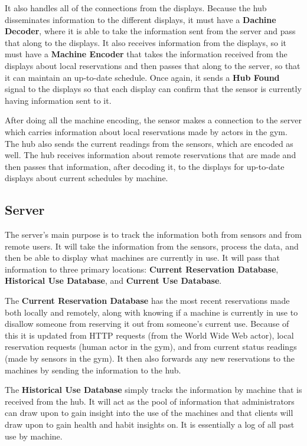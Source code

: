 \documentclass[PPFS.tex]{template/subfiles}
\begin{document}
It also handles all of the connections from the displays. Because the hub disseminates information to the different displays, it must have a \textbf{Dachine Decoder}, where it is able to take the information sent from the server and pass that along to the displays. It also receives information from the displays, so it must have a \textbf{Machine Encoder} that takes the information received from the displays about local reservations and then passes that along to the server, so that it can maintain an up-to-date schedule. Once again, it sends a \textbf{Hub Found} signal to the displays so that each display can confirm that the sensor is currently having information sent to it.

After doing all the machine encoding, the sensor makes a connection to the server which carries information about local reservations made by actors in the gym. The hub also sends the current readings from the sensors, which are encoded as well. The hub receives information about remote reservations that are made and then passes that information, after decoding it, to the displays for up-to-date displays about current schedules by machine.

\subsection{Server}

The server's main purpose is to track the information both from sensors and from remote users. It will take the information from the sensors, process the data, and then be able to display what machines are currently in use. It will pass that information to three primary locations: \textbf{Current Reservation Database}, \textbf{Historical Use Database}, and \textbf{Current Use Database}.

The \textbf{Current Reservation Database} has the most recent reservations made both locally and remotely, along with knowing if a machine is currently in use to disallow someone from reserving it out from someone's current use. Because of this it is updated from HTTP requests (from the World Wide Web actor), local reservation requests (human actor in the gym), and from current status readings (made by sensors in the gym). It then also forwards any new reservations to the machines by sending the information to the hub.

The \textbf{Historical Use Database} simply tracks the information by machine that is received from the hub. It will act as the pool of information that administrators can draw upon to gain insight into the use of the machines and that clients will draw upon to gain health and habit insights on. It is essentially a log of all past use by machine.
\end{document}
